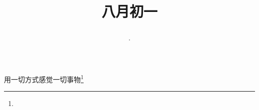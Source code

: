 \title{\date[d=3,m=9,y=2024][year:cn-y,年,month:cn,day:cn,日,·,weekday]·八月初一 }
用一切方式感觉一切事物\footnote{ }

